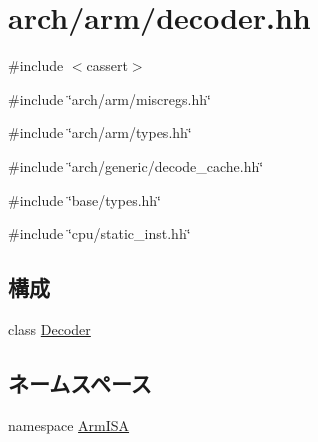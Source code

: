 \hypertarget{arm_2decoder_8hh}{
\section{arch/arm/decoder.hh}
\label{arm_2decoder_8hh}
}
{\ttfamily \#include $<$cassert$>$}\par
{\ttfamily \#include \char`\"{}arch/arm/miscregs.hh\char`\"{}}\par
{\ttfamily \#include \char`\"{}arch/arm/types.hh\char`\"{}}\par
{\ttfamily \#include \char`\"{}arch/generic/decode\_\-cache.hh\char`\"{}}\par
{\ttfamily \#include \char`\"{}base/types.hh\char`\"{}}\par
{\ttfamily \#include \char`\"{}cpu/static\_\-inst.hh\char`\"{}}\par
\subsection*{構成}
\begin{DoxyCompactItemize}
\item 
class \hyperlink{classArmISA_1_1Decoder}{Decoder}
\end{DoxyCompactItemize}
\subsection*{ネームスペース}
\begin{DoxyCompactItemize}
\item 
namespace \hyperlink{namespaceArmISA}{ArmISA}
\end{DoxyCompactItemize}
